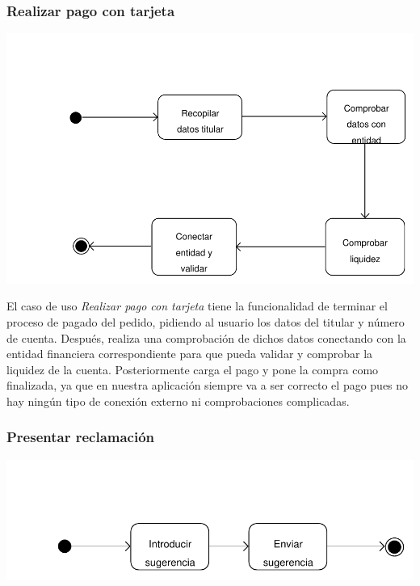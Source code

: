 \documentclass[11pt, a4paper, twoside, titlepage]{article}
\begin{document}
			\subsubsection{Realizar pago con tarjeta}
				\begin{center}
					\hspace*{-1cm} \includegraphics[scale=.65]{analisis/diagramas/da_pagotarjeta.pdf}
				\end{center}

				El caso de uso {\itshape Realizar pago con tarjeta} tiene la funcionalidad de terminar el proceso de pagado del pedido, pidiendo al usuario los datos del titular y número de cuenta. Después, realiza una comprobación de dichos datos conectando con la entidad financiera correspondiente para que pueda validar y comprobar la liquidez de la cuenta. Posteriormente carga el pago y pone la compra como finalizada, ya que en nuestra aplicación siempre va a ser correcto el pago pues no hay ningún tipo de conexión externo ni comprobaciones complicadas.
				
			\subsubsection{Presentar reclamación}
				\begin{center}
					\hspace*{-1.5cm} \includegraphics[scale=.82]{analisis/diagramas/da_presentarreclamacion.pdf}
				\end{center}
\end{document}

